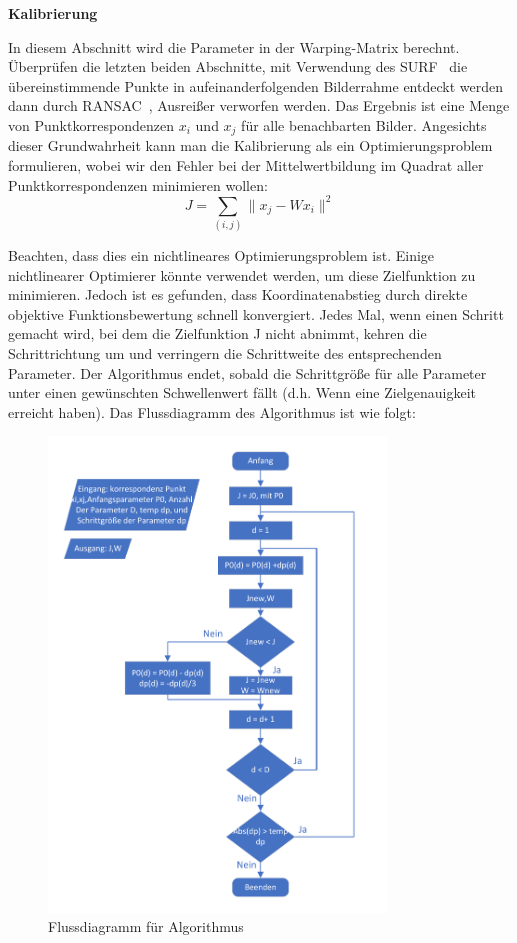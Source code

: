 \textbf{Kalibrierung}

In diesem Abschnitt wird die Parameter in der Warping-Matrix berechnt. Überprüfen die letzten beiden Abschnitte, mit Verwendung des SURF~\cite{Surf} die übereinstimmende Punkte in aufeinanderfolgenden Bilderrahme entdeckt werden dann durch RANSAC~\cite{ransac1}, Ausreißer verworfen werden. Das Ergebnis ist eine Menge von Punktkorrespondenzen $x_i$ und $x_j$ für alle benachbarten Bilder. Angesichts dieser Grundwahrheit kann man die Kalibrierung als ein Optimierungsproblem formulieren, wobei wir den Fehler bei der Mittelwertbildung im Quadrat aller Punktkorrespondenzen minimieren wollen:
\begin{equation}
   J = \sum_{(i,j)}\lVert x_j - Wx_i \rVert ^2
\end{equation}

Beachten, dass dies ein nichtlineares Optimierungsproblem ist. Einige nichtlinearer Optimierer könnte verwendet werden, um diese Zielfunktion zu minimieren. Jedoch ist es gefunden, dass Koordinatenabstieg durch direkte objektive Funktionsbewertung schnell konvergiert. Jedes Mal, wenn einen Schritt gemacht wird, bei dem die Zielfunktion J nicht abnimmt, kehren die Schrittrichtung um und verringern die Schrittweite des entsprechenden
Parameter. Der Algorithmus endet, sobald die Schrittgröße für alle Parameter unter einen gewünschten Schwellenwert fällt (d.h. Wenn eine Zielgenauigkeit erreicht haben). Das Flussdiagramm des Algorithmus ist wie folgt:

\begin{figure}[H]
 \centering 
 \includegraphics[keepaspectratio,width=0.8\textwidth]{images/4_ZweiteErfahrung/Kamera/flussdiagramm_for_parameter.pdf}
 \caption{Flussdiagramm für Algorithmus}
 \label{fig:rotationsmodel}
\end{figure} 

